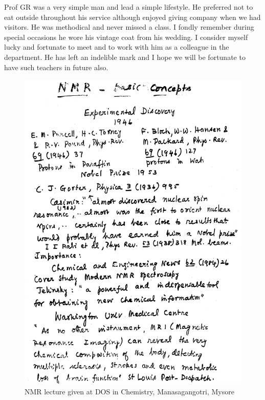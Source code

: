 Prof GR was a very simple man and lead a simple lifestyle. He preferred not to eat outside throughout his
service although enjoyed giving company when we had visitors. He was methodical and never missed a class. I
fondly remember during special occasions he wore his vintage coat from his wedding. I consider myself lucky and
fortunate to meet and to work with him as a colleague in the department. He has left an indelible mark and I
hope we will be fortunate to have such teachers in future also.
\begin{figure}[H]
\centering
\includegraphics[scale=0.48]{src/images/chap8/1.eps}
\caption{NMR lecture given at DOS in Chemistry, Manasagangotri, Mysore}
\end{figure}
